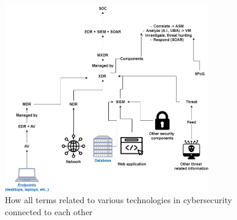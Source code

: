 







\begin{figure}[H]
      \centering
      \includegraphics[width=0.8\textwidth]{Figures/XDR.jpg}
      \caption{How all terms related to various technologies in cybersecurity connected to each other}
      \label{fig:xdr}
\end{figure}

